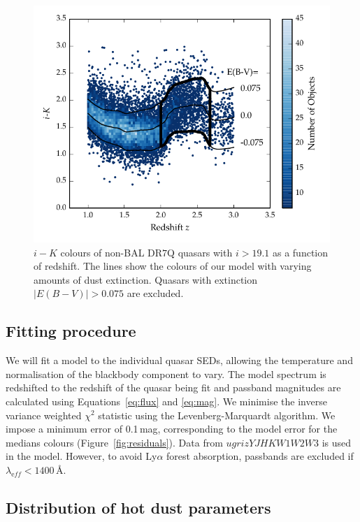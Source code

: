 \begin{figure}[t!]
  \centering
  \includegraphics[width=\columnwidth]{figures/chapter05/ik_versus_z_low_ext.pdf}
  \caption[{$i-K$ colours of non-BAL DR$7$ quasars with $i>19.1$ as a function of redshift.}]{$i-K$ colours of non-BAL DR$7$Q quasars with $i>19.1$ as a function of redshift. The lines show the colours of our model with varying amounts of dust extinction. Quasars with extinction $|E(B-V)|>0.075$ are excluded.}
  \label{fig:ikzplot}
\end{figure}


\subsection{Fitting procedure}

We will fit a model to the individual quasar SEDs, allowing the temperature and normalisation of the blackbody component to vary. 
The model spectrum is redshifted to the redshift of the quasar being fit and passband magnitudes are calculated using Equations~\ref{eq:flux} and \ref{eq:mag}.   
We minimise the inverse variance weighted $\chi^2$ statistic using the Levenberg-Marquardt algorithm. 
We impose a minimum error of 0.1\,mag, corresponding to the model error for the medians colours (Figure~\ref{fig:residuals}). 
Data from $ugrizYJHKW1W2W3$ is used in the model. 
However, to avoid Ly$\alpha$ forest absorption, passbands are excluded if $\lambda_{\mathrm eff} < 1400$\,\AA.   

\subsection{Distribution of hot dust parameters}

